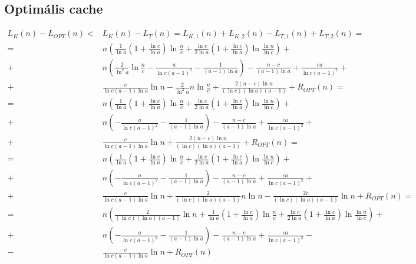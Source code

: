 \documentclass{article}
\begin{document}
\subsection{Optimális cache}

\begin{align*}
L_K(n)- L_{OPT}(n) <& L_K(n)- L_T(n) = L_{K,1}(n) + L_{K,2}(n) - L_{T,1}(n) + L_{T,2}(n) = \\
=& n \left( \frac{1}{\ln{a}} \left( 1 + \frac{\ln{c}}{\ln{a}} \right) \ln{\frac{n}{c}} + \frac{\ln{c}}{2\ln{a}} \left( 1 + \frac{\ln{c}}{\ln{a}} \right) \ln{\frac{\ln{n}}{\ln{c}}} \right) + \\
+& n \left( \frac{2}{\ln^2{a}} \ln{\frac{n}{c}} - \frac{a}{\ln{c} (a-1)^2} - \frac{1}{(a-1) \ln{a}} \right) - \frac{n - c}{(a-1) \ln{a}} + \frac{c a}{\ln{c} (a-1)^2} + \\
+& \frac{c}{\ln{c} (a-1) \ln{a}} \ln{n} - \frac{2}{\ln^2{a}} n \ln{\frac{n}{c}} + \frac{2 \left( n - c \right) \ln{n} }{(\ln{c}) (\ln{a}) (a-1)} + R_{OPT}(n) = \\
=& n \left( \frac{1}{\ln{a}} \left( 1 + \frac{\ln{c}}{\ln{a}} \right) \ln{\frac{n}{c}} + \frac{\ln{c}}{2\ln{a}} \left( 1 + \frac{\ln{c}}{\ln{a}} \right) \ln{\frac{\ln{n}}{\ln{c}}} \right) + \\
+& n \left( - \frac{a}{\ln{c} (a-1)^2} - \frac{1}{(a-1) \ln{a}} \right) - \frac{n - c}{(a-1) \ln{a}} + \frac{c a}{\ln{c} (a-1)^2} + \\
+& \frac{c}{\ln{c} (a-1) \ln{a}} \ln{n} + \frac{2 \left( n - c \right) \ln{n} }{(\ln{c}) (\ln{a}) (a-1)} + R_{OPT}(n) = \\
=& n \left( \frac{1}{\ln{a}} \left( 1 + \frac{\ln{c}}{\ln{a}} \right) \ln{\frac{n}{c}} + \frac{\ln{c}}{2\ln{a}} \left( 1 + \frac{\ln{c}}{\ln{a}} \right) \ln{\frac{\ln{n}}{\ln{c}}} \right) + \\
+& n \left( - \frac{a}{\ln{c} (a-1)^2} - \frac{1}{(a-1) \ln{a}} \right) - \frac{n - c}{(a-1) \ln{a}} + \frac{c a}{\ln{c} (a-1)^2} + \\
+& \frac{c}{\ln{c} (a-1) \ln{a}} \ln{n} + \frac{2 }{(\ln{c}) (\ln{a}) (a-1)} n \ln{n} - \frac{2 c }{(\ln{c}) (\ln{a}) (a-1)} \ln{n} + R_{OPT}(n) = \\
=& n \left( \frac{2 }{(\ln{c}) (\ln{a}) (a-1)} \ln{n} + \frac{1}{\ln{a}} \left( 1 + \frac{\ln{c}}{\ln{a}} \right) \ln{\frac{n}{c}} + \frac{\ln{c}}{2\ln{a}} \left( 1 + \frac{\ln{c}}{\ln{a}} \right) \ln{\frac{\ln{n}}{\ln{c}}} \right) + \\
+& n \left( - \frac{a}{\ln{c} (a-1)^2} - \frac{1}{(a-1) \ln{a}} \right) - \frac{n - c}{(a-1) \ln{a}} + \frac{c a}{\ln{c} (a-1)^2} - \\
-& \frac{c}{\ln{c} (a-1) \ln{a}} \ln{n} + R_{OPT}(n)
\end{align*}
\end{document}
